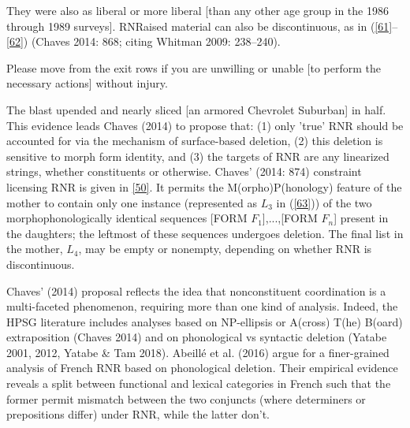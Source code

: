 \documentclass[output=paper
                ,modfonts
                ,nonflat
	        ,collection
	        ,collectionchapter
	        ,collectiontoclongg
 	        ,biblatex
                ,babelshorthands
                ,newtxmath
                ,draftmode
                ,colorlinks, citecolor=brown
]{./langsci/langscibook}
\begin{document}
{\ea They were also as liberal or more liberal [than any other age group in the 1986 through 1989 surveys].\label{60}\z
RNRaised material can also be discontinuous, as in (\ref{61}--\ref{62}) (Chaves 2014: 868; citing Whitman 2009: 238--240).

\ea Please move from the exit rows if you are unwilling or unable [to perform the necessary actions] without injury.\label{61}\z

\ea The blast upended and nearly sliced [an armored Chevrolet Suburban] in half.\label{62}\z
This evidence leads Chaves (2014) to propose that: (1) only 'true' RNR should be accounted for via the mechanism of surface-based deletion, (2) this deletion is sensitive to morph form identity, and (3) the targets of RNR are any linearized strings, whether constituents or otherwise. Chaves' (2014: 874) constraint licensing RNR is given in \ref{50}. It permits the M(orpho)P(honology) feature of the mother to contain only one instance (represented as $L_{3}$ in (\ref{63})) of the two morphophonologically identical sequences [FORM $F_{1}$],...,[FORM $F_{n}$] present in the daughters; the leftmost of these sequences undergoes deletion. The final list in the mother, $L_{4}$, may be empty or nonempty, depending on whether RNR is discontinuous.


\z



Chaves' (2014) proposal reflects the idea that nonconstituent coordination is a multi-faceted phenomenon, requiring more than one kind of analysis. Indeed, the HPSG literature includes analyses based on NP-ellipsis or A(cross) T(he) B(oard) extraposition (Chaves 2014) and on phonological vs syntactic deletion (Yatabe 2001, 2012, Yatabe \& Tam 2018). Abeill\'{e} et al. (2016) argue for a finer-grained analysis of French RNR based on phonological deletion. Their empirical evidence reveals a split between functional and lexical categories in French such that the former permit mismatch between the two conjuncts (where determiners or prepositions differ) under RNR, while the latter don't.



}
\end{document}
